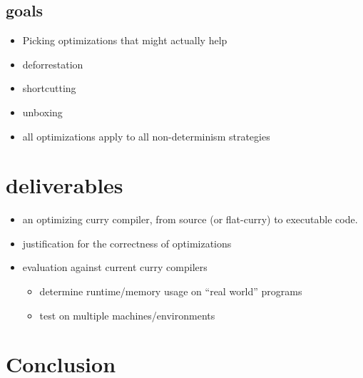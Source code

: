 \documentclass{article}
\begin{document}
\subsection{goals}
\begin{itemize}
    \item Picking optimizations that might actually help
    \item deforrestation
    \item shortcutting
    \item unboxing
    \item all optimizations apply to all non-determinism strategies
\end{itemize}
\section{deliverables}
\begin{itemize}
  \item an optimizing curry compiler, from source (or flat-curry) to executable code.
  \item justification for the correctness of optimizations
  \item evaluation against current curry compilers
  \begin{itemize}
    \item determine runtime/memory usage on ``real world'' programs
    \item test on multiple machines/environments
  \end{itemize}
\end{itemize}
\section{Conclusion}
\end{document}
